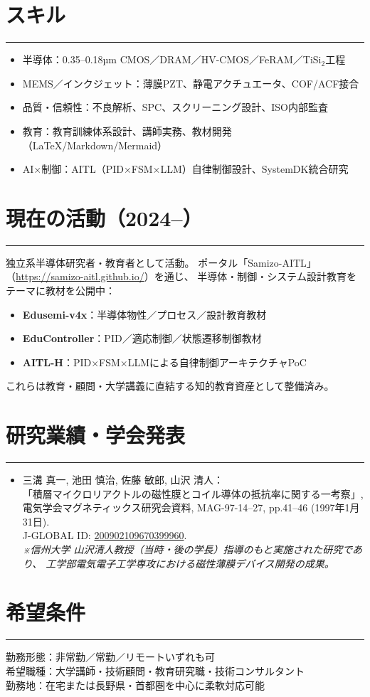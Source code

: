 \documentclass[lualatex,ja=standard,11pt]{bxjsarticle}
\newcommand{\cvsection}[1]{\section*{#1}\vspace{-0.3em}\hrule\vspace{0.5em}}
\begin{document}
\cvsection{スキル}
\begin{itemize}
  \item 半導体：0.35–0.18µm CMOS／DRAM／HV-CMOS／FeRAM／TiSi$_2$工程
  \item MEMS／インクジェット：薄膜PZT、静電アクチュエータ、COF/ACF接合
  \item 品質・信頼性：不良解析、SPC、スクリーニング設計、ISO内部監査
  \item 教育：教育訓練体系設計、講師実務、教材開発（LaTeX/Markdown/Mermaid）
  \item AI×制御：AITL（PID×FSM×LLM）自律制御設計、SystemDK統合研究
\end{itemize}

\cvsection{現在の活動（2024–）}
独立系半導体研究者・教育者として活動。  
ポータル「Samizo-AITL」（\href{https://samizo-aitl.github.io/}{https://samizo-aitl.github.io/}）を通じ、  
半導体・制御・システム設計教育をテーマに教材を公開中：  
\begin{itemize}
  \item \textbf{Edusemi-v4x}：半導体物性／プロセス／設計教育教材
  \item \textbf{EduController}：PID／適応制御／状態遷移制御教材
  \item \textbf{AITL-H}：PID×FSM×LLMによる自律制御アーキテクチャPoC
\end{itemize}
これらは教育・顧問・大学講義に直結する知的教育資産として整備済み。

\cvsection{研究業績・学会発表}
\begin{itemize}
  \item 三溝 真一, 池田 慎治, 佐藤 敏郎, 山沢 清人：\\
  「積層マイクロリアクトルの磁性膜とコイル導体の抵抗率に関する一考察」,\\
  電気学会マグネティックス研究会資料, MAG-97-14–27, pp.41–46 (1997年1月31日).\\
  J-GLOBAL ID: \href{https://jglobal.jst.go.jp/detail?JGLOBAL_ID=200902109670399960}{200902109670399960}.\\
  \textit{※信州大学 山沢清人教授（当時・後の学長）指導のもと実施された研究であり、
  工学部電気電子工学専攻における磁性薄膜デバイス開発の成果。}
\end{itemize}

\cvsection{希望条件}
勤務形態：非常勤／常勤／リモートいずれも可\\
希望職種：大学講師・技術顧問・教育研究職・技術コンサルタント\\
勤務地：在宅または長野県・首都圏を中心に柔軟対応可能
\end{document}
